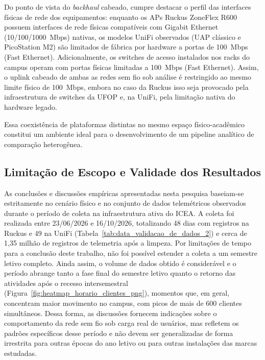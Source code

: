 Do ponto de vista do \textit{backhaul} cabeado, cumpre destacar o perfil das interfaces físicas de rede dos equipamentos: enquanto os APs Ruckus ZoneFlex R600 possuem interfaces de rede físicas compatíveis com Gigabit Ethernet (10/100/1000~Mbps) nativas, os modelos UniFi observados (UAP clássico e PicoStation M2) são limitados de fábrica por hardware a portas de 100~Mbps (Fast Ethernet). Adicionalmente, os switches de acesso instalados nos racks do campus operam com portas físicas limitadas a 100~Mbps (Fast Ethernet). Assim, o uplink cabeado de ambas as redes sem fio sob análise é restringido ao mesmo limite físico de 100~Mbps, embora no caso da Ruckus isso seja provocado pela infraestrutura de switches da UFOP e, na UniFi, pela limitação nativa do hardware legado.

Essa coexistência de plataformas distintas no mesmo espaço físico-acadêmico constitui um ambiente ideal para o desenvolvimento de um pipeline analítico de comparação heterogênea.

\subsection{Limitação de Escopo e Validade dos Resultados}
\label{subsec:metodologia_escopo}

As conclusões e discussões empíricas apresentadas nesta pesquisa baseiam-se estritamente no cenário físico e no conjunto de dados telemétricos observados durante o período de coleta na infraestrutura ativa do ICEA. A coleta foi realizada entre 23/06/2026 e 16/10/2026, totalizando 48 dias com registros na Ruckus e 49 na UniFi (Tabela~\ref{tab:data_validacao_de_dados_2}) e cerca de 1,35 milhão de registros de telemetria após a limpeza. Por limitações de tempo para a conclusão deste trabalho, não foi possível estender a coleta a um semestre letivo completo. Ainda assim, o volume de dados obtido é considerável e o período abrange tanto a fase final do semestre letivo quanto o retorno das atividades após o recesso intersemestral (Figura~\ref{fig:heatmap_horario_clientes_png}), momentos que, em geral, concentram maior movimento no campus, com picos de mais de 600 clientes simultâneos. Dessa forma, as discussões fornecem indicações sobre o comportamento da rede sem fio sob carga real de usuários, mas refletem os padrões específicos desse período e não devem ser generalizadas de forma irrestrita para outras épocas do ano letivo ou para outras instalações das marcas estudadas.


